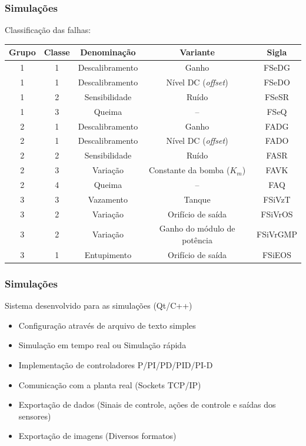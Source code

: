 \documentclass{beamer}
\begin{document}
\begin{frame}
    \frametitle{Simulações}

    Classificação das falhas:

\begin{table}[!htb]
\scriptsize
\centering
\begin{tabular}{|c|c|c|c|c|}
\hline
{\bf Grupo} & {\bf Classe} & {\bf Denominação} & {\bf Variante} & {\bf Sigla}\\
\hline
\hline
1 & 1 & Descalibramento & Ganho & FSeDG\\
\hline
1 & 1 & Descalibramento & Nível DC ({\it offset}) & FSeDO\\
\hline
1 & 2 & Sensibilidade & Ruído & FSeSR\\
\hline
1 & 3 & Queima & -- & FSeQ\\
\hline
\hline
2 & 1 & Descalibramento & Ganho & FADG\\
\hline
2 & 1 & Descalibramento & Nível DC ({\it offset}) & FADO\\
\hline
2 & 2 & Sensibilidade & Ruído & FASR\\
\hline
2 & 3 & Variação & Constante da bomba ($K_m$) & FAVK\\
\hline
2 & 4 & Queima & -- & FAQ\\
\hline
\hline
3 & 3 & Vazamento & Tanque & FSiVzT\\
\hline
3 & 2 & Variação & Orifício de saída & FSiVrOS\\
\hline
3 & 2 & Variação & Ganho do módulo de potência & FSiVrGMP\\
\hline
3 & 1 & Entupimento & Orifício de saída & FSiEOS\\
\hline
\end{tabular}
\end{table}
\end{frame}

\begin{frame}
    \frametitle{Simulações}

    Sistema desenvolvido para as simulações (Qt/C++)

\begin{itemize}
    \item Configuração através de arquivo de texto simples
    \item Simulação em tempo real ou Simulação rápida
    \item Implementação de controladores P/PI/PD/PID/PI-D
    \item Comunicação com a planta real (Sockets TCP/IP)
    \item Exportação de dados (Sinais de controle, ações de controle e saídas
          dos sensores)
    \item Exportação de imagens (Diversos formatos)
\end{itemize}

\end{frame}
\end{document}
